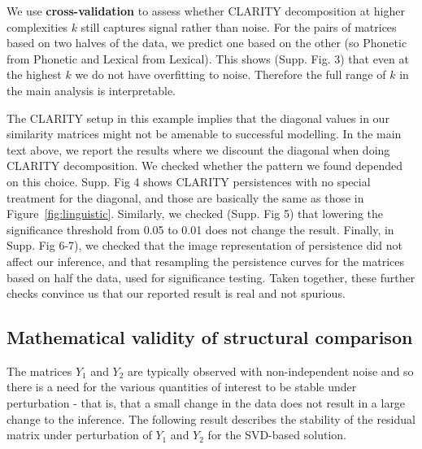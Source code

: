 \documentclass[a4]{article}
\newcommand{\+}[1]{\mathbf{#1}}
\begin{document}
We use \textbf{cross-validation} to assess whether CLARITY decomposition at higher complexities $k$ still captures signal rather than noise. For the pairs of matrices based on two halves of the data, we predict one based on the other (so Phonetic from Phonetic and Lexical from Lexical). This shows (Supp. Fig. 3) that even at the highest $k$ we do not have overfitting to noise. Therefore the full range of $k$ in the main analysis is interpretable. 

The CLARITY setup in this example implies that the diagonal values in our similarity matrices might not be amenable to successful modelling. In the main text above, we report the results where we discount the diagonal when doing CLARITY decomposition. We checked whether the pattern we found depended on this choice. Supp. Fig 4 shows CLARITY persistences with no special treatment for the diagonal, and those are basically the same as those in Figure~\ref{fig:linguistic}. Similarly, we checked (Supp. Fig 5) that lowering the significance threshold from 0.05 to 0.01 does not change the result. Finally, in Supp. Fig 6-7), we checked that the image representation of persistence did not affect our inference, and that resampling  the persistence curves for the matrices based on half the data, used for significance testing. Taken together, these further checks convince us that our reported result is real and not spurious. 

\subsection{Mathematical validity of structural comparison}
\label{sec:math}

The matrices $Y_{1}$ and $Y_{2}$ are typically observed with non-independent noise and so there is a need for the various quantities of interest to be stable under perturbation - that is, that a small change in the data does not result in a large change to the inference. The following result describes the stability of the residual matrix under perturbation of $Y_{1}$ and $Y_{2}$ for the SVD-based solution.
\end{document}
